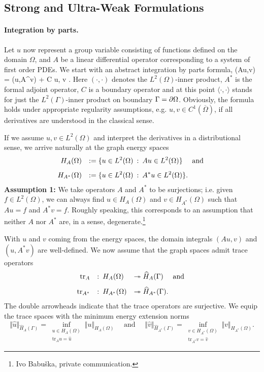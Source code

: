 \subsection{Strong and Ultra-Weak Formulations}




\paragraph*{Integration by parts.}

Let $u$ now represent a group variable consisting of functions defined
on the domain $\Omega$, and $A$ be a linear differential operator
corresponding to a system of first order PDEs. We start with an abstract
integration by parts formula,
\be
(Au,v) = (u,A^\ast v) + \langle C u, v\rangle
\label{eq:integration_by_parts_classical}.
\ee
Here $(\cdot,\cdot)$ denotes the $L^2(\Omega)$-inner product, $A^\ast$ is the formal
adjoint operator, $C$ is  a  boundary operator and at this point $\langle\cdot,\cdot\rangle$ 
stands for just the $L^2(\Gamma)$-inner
product on boundary $\Gamma = \ptl \Omega$. Obviously, the formula holds under
appropriate regularity assumptions, e.g. $u,v \in C^1(\overline{\Omega})$, if all
derivatives are understood in the classical sense.

If we assume $u,v \in L^2(\Omega)$ and interpret the derivatives in a distributional sense,
we arrive naturally at the graph energy spaces
\[
\begin{array}{rl}
\ds H_A(\Omega) & \ds := \{ u \in L^2(\Omega) \: : \: A u \in L^2(\Omega) \} \quad \text{ and }\\[8pt]
\ds H_{A^\ast}(\Omega) & \ds := \{ u \in L^2(\Omega) \: : \: A^\ast u \in L^2(\Omega) \}.
\end{array}
\]
{ {\bf Assumption 1:} We take operators $A$ and $A^\ast$ to be surjections; i.e. given $f \in L^2(\Omega)$, we
  can always find $u \in H_A(\Omega)$ and $v \in H_{A^\ast}(\Omega)$
  such that $Au = f$ and $A^\ast v = f$.  Roughly speaking, this
  corresponds to an assumption  that neither $A$ nor $A^\ast$ are, in a sense,
  degenerate.\footnote{Ivo Babu\v{s}ka, private communication.}}

With $u$ and $v$ coming from the energy spaces, the domain integrals $(Au,v)$ and $(u, A^\ast v)$
are well-defined.  We now assume that the graph spaces admit
trace operators
\[
\begin{array}{rlll}
\text{tr}_A &\ds : \: H_A(\Omega) & \twoheadrightarrow  \widehat{H}_A(\Gamma) \quad \text{ and }\\[8pt]
\text{tr}_{A^\ast} &\ds : \: H_{A^\ast}(\Omega) & \twoheadrightarrow  \widehat{H}_{A^\ast}(\Gamma).
\end{array}
\]
The double arrowheads indicate that the trace operators are surjective. We equip the trace
spaces with the minimum energy extension norms
\[
\Vert \hat{u} \Vert_{\widehat{H}_A(\Gamma)} = \inf_{\substack{u \in H_A(\Omega)\\ \text{tr}_A u = \hat{u} }} \Vert u \Vert_{H_A(\Omega)} \quad \text{ and } \quad 
\Vert \hat{v} \Vert_{\widehat{H}_{A^*}(\Gamma)} = \inf_{\substack{v \in H_{A^*}(\Omega)\\ \text{tr}_{A^*} v = \hat{v} }} \Vert v \Vert_{H_{A^*}(\Omega)}.
\]

